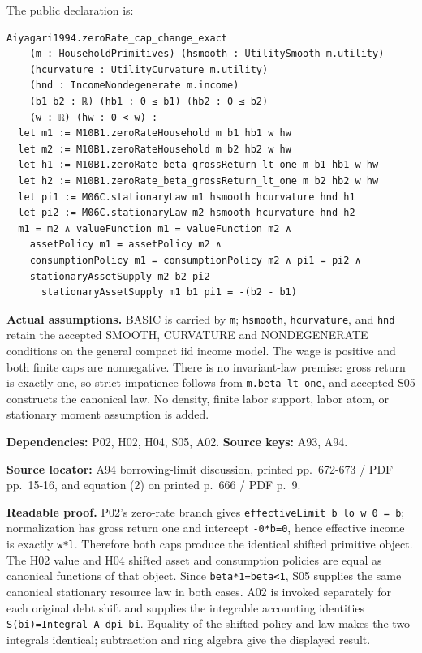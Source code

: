 \documentclass[
  11pt,
]{article}
\let\LedgerOriginalTexttt\texttt
\renewcommand{\texttt}[1]{{\small\LedgerOriginalTexttt{#1}}}
\begin{document}
The public declaration is:

\begin{verbatim}
Aiyagari1994.zeroRate_cap_change_exact
    (m : HouseholdPrimitives) (hsmooth : UtilitySmooth m.utility)
    (hcurvature : UtilityCurvature m.utility)
    (hnd : IncomeNondegenerate m.income)
    (b1 b2 : ℝ) (hb1 : 0 ≤ b1) (hb2 : 0 ≤ b2)
    (w : ℝ) (hw : 0 < w) :
  let m1 := M10B1.zeroRateHousehold m b1 hb1 w hw
  let m2 := M10B1.zeroRateHousehold m b2 hb2 w hw
  let h1 := M10B1.zeroRate_beta_grossReturn_lt_one m b1 hb1 w hw
  let h2 := M10B1.zeroRate_beta_grossReturn_lt_one m b2 hb2 w hw
  let pi1 := M06C.stationaryLaw m1 hsmooth hcurvature hnd h1
  let pi2 := M06C.stationaryLaw m2 hsmooth hcurvature hnd h2
  m1 = m2 ∧ valueFunction m1 = valueFunction m2 ∧
    assetPolicy m1 = assetPolicy m2 ∧
    consumptionPolicy m1 = consumptionPolicy m2 ∧ pi1 = pi2 ∧
    stationaryAssetSupply m2 b2 pi2 -
      stationaryAssetSupply m1 b1 pi1 = -(b2 - b1)
\end{verbatim}

\textbf{Actual assumptions.} BASIC is carried by \texttt{m};
\texttt{hsmooth}, \texttt{hcurvature}, and \texttt{hnd} retain the
accepted SMOOTH, CURVATURE and NONDEGENERATE conditions on the general
compact iid income model. The wage is positive and both finite caps are
nonnegative. There is no invariant-law premise: gross return is exactly
one, so strict impatience follows from \texttt{m.beta\_lt\_one}, and
accepted S05 constructs the canonical law. No density, finite labor
support, labor atom, or stationary moment assumption is added.

\textbf{Dependencies:} P02, H02, H04, S05, A02. \textbf{Source keys:}
A93, A94.

\textbf{Source locator:} A94 borrowing-limit discussion, printed
pp.~672-673 / PDF pp.~15-16, and equation (2) on printed p.~666 / PDF
p.~9.

\textbf{Readable proof.} P02's zero-rate branch gives
\texttt{effectiveLimit\ b\ lo\ w\ 0\ =\ b}; normalization has gross
return one and intercept \texttt{-0*b=0}, hence effective income is
exactly \texttt{w*l}. Therefore both caps produce the identical shifted
primitive object. The H02 value and H04 shifted asset and consumption
policies are equal as canonical functions of that object. Since
\texttt{beta*1=beta\textless{}1}, S05 supplies the same canonical
stationary resource law in both cases. A02 is invoked separately for
each original debt shift and supplies the integrable accounting
identities \texttt{S(bi)=Integral\ A\ dpi-bi}. Equality of the shifted
policy and law makes the two integrals identical; subtraction and ring
algebra give the displayed result.
\end{document}
